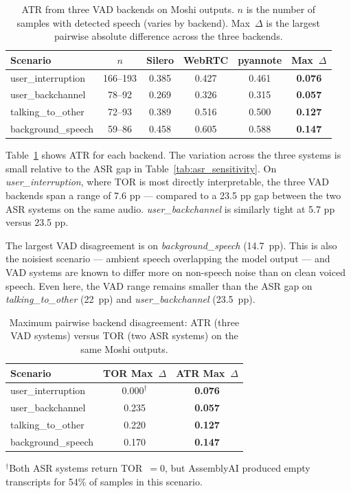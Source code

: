\documentclass[a4paper]{article}
\begin{document}
\begin{table}[t]
  \centering
  \caption{ATR from three VAD backends on Moshi outputs. $n$ is the number
           of samples with detected speech (varies by backend). Max~$\Delta$
           is the largest pairwise absolute difference across the three backends.}
  \label{tab:vad_variance}
  \begin{tabular}{lccccc}
    \toprule
    Scenario & $n$ & Silero & WebRTC & pyannote & Max~$\Delta$ \\
    \midrule
    user\_interruption  & 166--193 & 0.385 & 0.427 & 0.461 & \textbf{0.076} \\
    user\_backchannel   &  78--92  & 0.269 & 0.326 & 0.315 & \textbf{0.057} \\
    talking\_to\_other  &  72--93  & 0.389 & 0.516 & 0.500 & \textbf{0.127} \\
    background\_speech  &  59--86  & 0.458 & 0.605 & 0.588 & \textbf{0.147} \\
    \bottomrule
  \end{tabular}
\end{table}

Table~\ref{tab:vad_variance} shows ATR for each backend. The variation across
the three systems is small relative to the ASR gap in
Table~\ref{tab:asr_sensitivity}. On \emph{user\_interruption}, where TOR is
most directly interpretable, the three VAD backends span a range of 7.6 pp ---
compared to a 23.5 pp gap between the two ASR systems on the same audio.
\emph{user\_backchannel} is similarly tight at 5.7 pp versus 23.5 pp.

The largest VAD disagreement is on \emph{background\_speech} (14.7~pp). This
is also the noisiest scenario --- ambient speech overlapping the model output
--- and VAD systems are known to differ more on non-speech noise than on clean
voiced speech. Even here, the VAD range remains smaller than the ASR gap on
\emph{talking\_to\_other} (22~pp) and \emph{user\_backchannel} (23.5~pp).

\begin{table}[t]
  \centering
  \caption{Maximum pairwise backend disagreement: ATR (three VAD systems)
           versus TOR (two ASR systems) on the same Moshi outputs.}
  \label{tab:comparison}
  \begin{tabular}{lcc}
    \toprule
    Scenario & TOR Max~$\Delta$ & ATR Max~$\Delta$ \\
    \midrule
    user\_interruption  & $0.000^{\dagger}$ & \textbf{0.076} \\
    user\_backchannel   & 0.235             & \textbf{0.057} \\
    talking\_to\_other  & 0.220             & \textbf{0.127} \\
    background\_speech  & 0.170             & \textbf{0.147} \\
    \bottomrule
  \end{tabular}
  {\small $^{\dagger}$Both ASR systems return TOR~$= 0$, but AssemblyAI
  produced empty transcripts for 54\% of samples in this scenario.}
\end{table}
\end{document}
